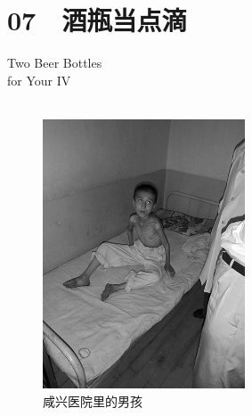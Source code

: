 \fancyhead[RO]{{\tiny{\textcolor{Gray}{\FA \ }}}\thepage}
\fancyhead[LE]{{\tiny{\textcolor{Gray}{\FA \ }}}\thepage}
\fancyfoot[LE,RO]{}
\fancyfoot[LO,CE]{}
\fancyfoot[CO,RE]{}
\chapter*{07 {\FA } 酒瓶当点滴}
\vspace{15mm}
\begin{flushright}
	\textcolor{PinYinColor}{\EN \huge{Two Beer Bottles\\
		for Your IV\\
	\ \\}}
\end{flushright}

\begin{figure}[!htbp]
	\centering
	\includegraphics[width=6cm]{./Chapters/Images/07.jpg}
	\caption*{咸兴医院里的男孩}
\end{figure}

